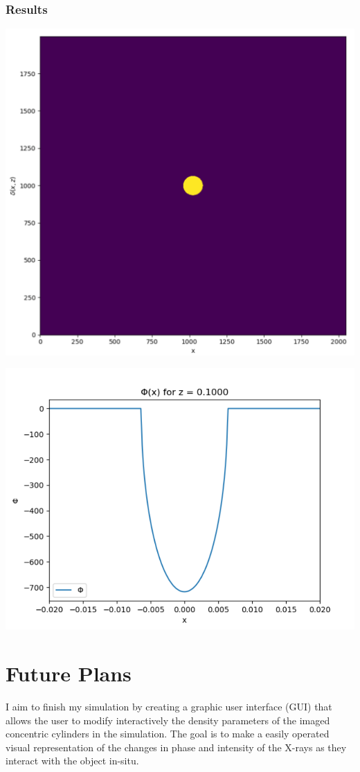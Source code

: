 \documentclass[9pt, a4paper]{article}
\newenvironment{Figure}
    {\par\medskip\noindent\minipage{\linewidth}}
    {\endminipage\par\medskip}
\begin{document}
\subsubsection{Results}
\begin{Figure}
\centering
\includegraphics[width=0.6\linewidth]{cross_section.pdf}
\end{Figure}
\begin{Figure}
\centering
\includegraphics[width=0.6\linewidth]{20000.pdf}
\end{Figure}

\section{Future Plans}
I aim to finish my simulation by creating a graphic user interface (GUI) that allows the user to modify interactively the density parameters of the imaged concentric cylinders in the simulation. The goal is to make a easily operated visual representation of the changes in phase and intensity of the X-rays as they interact with the object in-situ.
\end{document}
